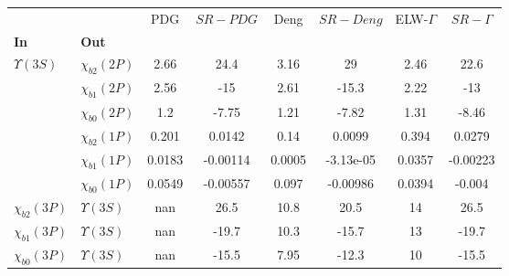 \begin{tabular}{l|l|c|c|c|c|c|c}
\toprule
                &                &    PDG & $SR-PDG$ &   Deng & $SR-Deng$ &  ELW-$\Gamma$ & $SR-\Gamma$ \\
\textbf{In} & \textbf{Out} &        &          &        &           &               &             \\
\midrule
\textbf{$\Upsilon(3S)$} & \textbf{$\chi_{b2}(2P)$} &   2.66 &     24.4 &   3.16 &        29 &          2.46 &        22.6 \\
                & \textbf{$\chi_{b1}(2P)$} &   2.56 &      -15 &   2.61 &     -15.3 &          2.22 &         -13 \\
                & \textbf{$\chi_{b0}(2P)$} &    1.2 &    -7.75 &   1.21 &     -7.82 &          1.31 &       -8.46 \\
                & \textbf{$\chi_{b2}(1P)$} &  0.201 &   0.0142 &   0.14 &    0.0099 &         0.394 &      0.0279 \\
                & \textbf{$\chi_{b1}(1P)$} & 0.0183 & -0.00114 & 0.0005 & -3.13e-05 &        0.0357 &    -0.00223 \\
                & \textbf{$\chi_{b0}(1P)$} & 0.0549 & -0.00557 &  0.097 &  -0.00986 &        0.0394 &      -0.004 \\
\textbf{$\chi_{b2}(3P)$} & \textbf{$\Upsilon(3S)$} &    nan &     26.5 &   10.8 &      20.5 &            14 &        26.5 \\
\textbf{$\chi_{b1}(3P)$} & \textbf{$\Upsilon(3S)$} &    nan &    -19.7 &   10.3 &     -15.7 &            13 &       -19.7 \\
\textbf{$\chi_{b0}(3P)$} & \textbf{$\Upsilon(3S)$} &    nan &    -15.5 &   7.95 &     -12.3 &            10 &       -15.5 \\
\bottomrule
\end{tabular}
